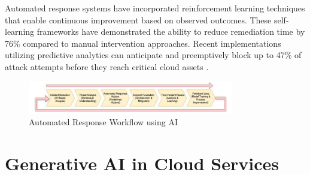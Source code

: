\documentclass[a4paper,12pt]{article}
\begin{document}
Automated response systems have incorporated reinforcement learning techniques that enable continuous improvement based on observed outcomes. These self-learning frameworks have demonstrated the ability to reduce remediation time by 76\% compared to manual intervention approaches. Recent implementations utilizing predictive analytics can anticipate and preemptively block up to 47\% of attack attempts before they reach critical cloud assets \citet{kumar2021}.

\begin{figure}[H]
    \centering
    \includegraphics[width=0.8\textwidth]{image2.png}
    \caption{Automated Response Workflow using AI}
    \label{fig:auto-workflow-ai}
\end{figure}

\section{Generative AI in Cloud Services}
\end{document}
